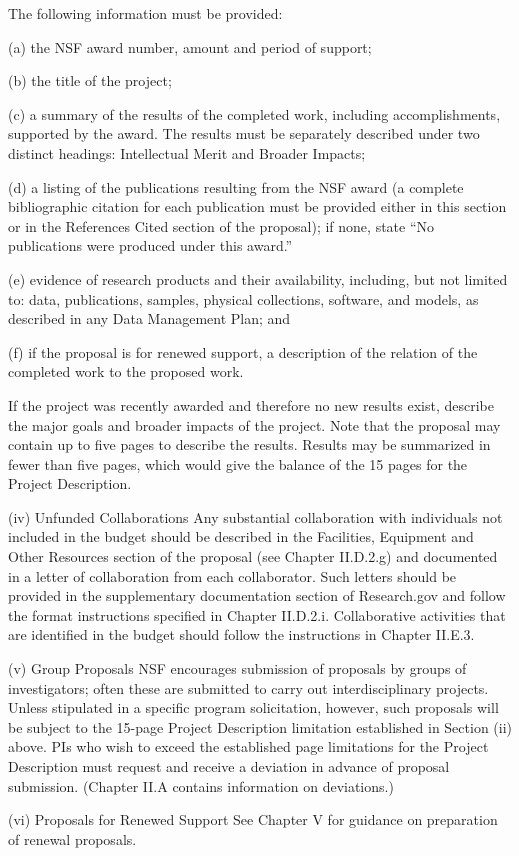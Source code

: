 {The following information must be provided:

(a) the NSF award number, amount and period of support;

(b) the title of the project;

(c) a summary of the results of the completed work, including accomplishments, supported by the award. The results must be separately described under two distinct headings: Intellectual Merit and Broader Impacts;

(d) a listing of the publications resulting from the NSF award (a complete bibliographic citation for each publication must be provided either in this section or in the References Cited section of the proposal); if none, state “No publications were produced under this award.”

(e) evidence of research products and their availability, including, but not limited to: data, publications, samples, physical collections, software, and models, as described in any Data Management Plan; and

(f) if the proposal is for renewed support, a description of the relation of the completed work to the proposed work.

If the project was recently awarded and therefore no new results exist, describe the major goals and broader impacts of the project. Note that the proposal may contain up to five pages to describe the results. Results may be summarized in fewer than five pages, which would give the balance of the 15 pages for the Project Description.

(iv) Unfunded Collaborations
Any substantial collaboration with individuals not included in the budget should be described in the Facilities, Equipment and Other Resources section of the proposal (see Chapter II.D.2.g) and documented in a letter of collaboration from each collaborator. Such letters should be provided in the supplementary documentation section of Research.gov and follow the format instructions specified in Chapter II.D.2.i. Collaborative activities that are identified in the budget should follow the instructions in Chapter II.E.3.

(v) Group Proposals
NSF encourages submission of proposals by groups of investigators; often these are submitted to carry out interdisciplinary projects. Unless stipulated in a specific program solicitation, however, such proposals will be subject to the 15-page Project Description limitation established in Section (ii) above. PIs who wish to exceed the established page limitations for the Project Description must request and receive a deviation in advance of proposal submission. (Chapter II.A contains information on deviations.)

(vi) Proposals for Renewed Support
See Chapter V for guidance on preparation of renewal proposals.


}
